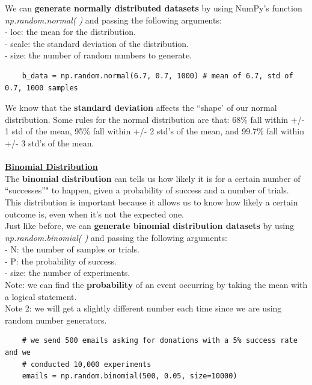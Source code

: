 \documentclass[11pt, a4paper]{article}
\begin{document}
\begin{spacing}{1.1}
	\noindent We can \textbf{generate normally distributed datasets} by using NumPy's function \textit{np.random.normal( )} and passing the following arguments: \\
	\hspace*{3mm} - loc: the mean for the distribution. \\
	\hspace*{3mm} - scale: the standard deviation of the distribution. \\
	\hspace*{3mm} - size: the number of random numbers to generate.
	\begin{lstlisting}
	b_data = np.random.normal(6.7, 0.7, 1000) # mean of 6.7, std of 0.7, 1000 samples \end{lstlisting}\vspace*{1mm}
	We know that the \textbf{standard deviation} affects the ``shape' of our normal distribution. Some rules for the normal distribution are that: 68\% fall within +/- 1 std of the mean, 95\% fall within +/- 2 std's of the mean, and 99.7\% fall within +/- 3 std's of the mean. \\~\\
	\underline{\textbf{Binomial Distribution}} \\
	The \textbf{binomial distribution} can tells us how likely it is for a certain number of ``successes”" to happen, given a probability of success and a number of trials. This distribution is important because it allows us to know how likely a certain outcome is, even when it’s not the expected one. \vspace*{1mm} \\
	Just like before, we can \textbf{generate binomial distribution datasets} by using \textit{np.random.binomial( )} and passing the following arguments: \\
	\hspace*{3mm} - N: the number of samples or trials. \\
	\hspace*{3mm} - P: the probability of success. \\
	\hspace*{3mm} - size: the number of experiments. \\
	Note: we can find the \textbf{probability} of an event occurring by taking the mean with a logical statement. \\
	Note 2: we will get a slightly different number each time since we are using random number generators.
	\begin{lstlisting}
	# we send 500 emails asking for donations with a 5% success rate and we 
	# conducted 10,000 experiments
	emails = np.random.binomial(500, 0.05, size=10000) 
	

\end{lstlisting}
\end{spacing}
\end{document}
